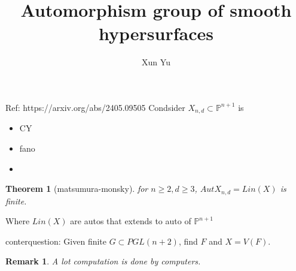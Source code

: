 \documentclass{article}
\title{Automorphism group of smooth hypersurfaces}
\author{Xun Yu}
\newtheorem{theorem}[definition]{Theorem}
\newtheorem{remark}[definition]{Remark}
\begin{document}
\maketitle
Ref: https://arxiv.org/abs/2405.09505
Condsider $X_{n,d} \subset \mathbb{P}^{n+1}$ is 
\begin{itemize}
  \item CY
  \item fano
  \item 
\end{itemize}
\begin{theorem}[matsumura-monsky]
  for $n\ge 2, d\ge 3$, $Aut X_{n,d}=Lin(X)$ is finite.
\end{theorem}
Where $Lin(X)$ are autos that extends to auto of $\mathbb{P}^{n+1}$

conterquestion: Given finite $G \subset PGL(n+2)$, find $F$ and $X=V(F)$. 

\begin{remark}
  A lot computation is done by computers.
\end{remark}
\end{document}
